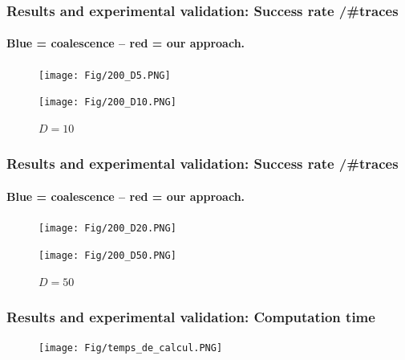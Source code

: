 \documentclass{beamer}
\begin{document}
\begin{frame}

\frametitle{Results and experimental validation: Success rate /\#traces}
\framesubtitle{Blue = coalescence -- red = our approach.}


\begin{figure}   
     \texttt{[image: Fig/200\_D5.PNG]}  
    \caption{$D=5$}

    
    \texttt{[image: Fig/200\_D10.PNG]}
    \caption{$D=10$}

        
\end{figure}

\end{frame}
\begin{frame}

\frametitle{Results and experimental validation: Success rate /\#traces}
\framesubtitle{Blue = coalescence -- red = our approach.}


\begin{figure}    
    \texttt{[image: Fig/200\_D20.PNG]}
    \caption{$D=20$}
    
    
    \texttt{[image: Fig/200\_D50.PNG]}
    \caption{$D=50$}
       

    
\end{figure}


\end{frame}
\begin{frame}

\frametitle{Results and experimental validation: Computation time}


\begin{figure}[H]
\begin{center}
\texttt{[image: Fig/temps\_de\_calcul.PNG]}
\end{center}
\label{temps de calcul}
\end{figure}

\end{frame}
\end{document}
